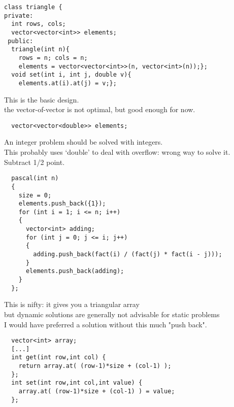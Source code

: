 

\begin{lstlisting}
class triangle {
private:
  int rows, cols;
  vector<vector<int>> elements;
 public:
  triangle(int n){
    rows = n; cols = n;
    elements = vector<vector<int>>(n, vector<int>(n));};
  void set(int i, int j, double v){
    elements.at(i).at(j) = v;};
\end{lstlisting}

This is the basic design.\\
the vector-of-vector is not optimal, but good enough for now.


\begin{lstlisting}
  vector<vector<double>> elements;
\end{lstlisting}

An integer problem should be solved with integers.\\
This probably uses `double' to deal with overflow: wrong way to solve it.\\
Subtract 1/2 point.


\begin{lstlisting}
  pascal(int n)
  {
    size = 0;
    elements.push_back({1});
    for (int i = 1; i <= n; i++)
    {
      vector<int> adding;
      for (int j = 0; j <= i; j++)
      {
        adding.push_back(fact(i) / (fact(j) * fact(i - j)));
      }
      elements.push_back(adding);
    }
  };
\end{lstlisting}

This is nifty: it gives you a triangular array\\
but dynamic solutions are generally not advisable for static problems\\
I would have preferred a solution without this much "push back".


\begin{lstlisting}
  vector<int> array;
  [...]
  int get(int row,int col) {
    return array.at( (row-1)*size + (col-1) );
  };
  int set(int row,int col,int value) {
    array.at( (row-1)*size + (col-1) ) = value;
  };
\end{lstlisting}

